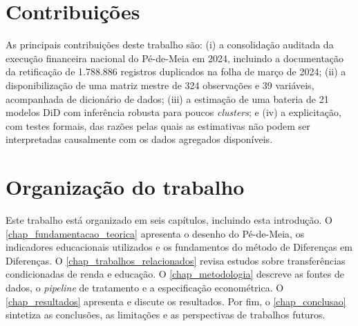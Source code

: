 \section{Contribuições}
\label{sec_contribuicoes}

As principais contribuições deste trabalho são:
(i) a consolidação auditada da execução financeira nacional do Pé-de-Meia em 2024, incluindo a documentação da retificação de 1.788.886 registros duplicados na folha de março de 2024;
(ii) a disponibilização de uma matriz mestre de 324 observações e 39 variáveis, acompanhada de dicionário de dados;
(iii) a estimação de uma bateria de 21 modelos DiD com inferência robusta para poucos \textit{clusters}; e
(iv) a explicitação, com testes formais, das razões pelas quais as estimativas não podem ser interpretadas causalmente com os dados agregados disponíveis.

\section{Organização do trabalho}
\label{sec_organizacao_trabalho}

Este trabalho está organizado em seis capítulos, incluindo esta introdução.
O \autoref{chap_fundamentacao_teorica} apresenta o desenho do Pé-de-Meia, os indicadores educacionais utilizados e os fundamentos do método de Diferenças em Diferenças.
O \autoref{chap_trabalhos_relacionados} revisa estudos sobre transferências condicionadas de renda e educação.
O \autoref{chap_metodologia} descreve as fontes de dados, o \textit{pipeline} de tratamento e a especificação econométrica.
O \autoref{chap_resultados} apresenta e discute os resultados.
Por fim, o \autoref{chap_conclusao} sintetiza as conclusões, as limitações e as perspectivas de trabalhos futuros.
